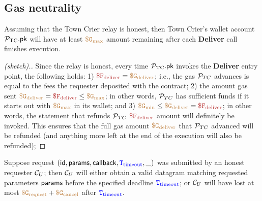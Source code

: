 \subsection{Gas neutrality}

\begin{theorem}
Assuming that the Town Crier relay is honest, 
then Town Crier's wallet account ${\mathcal{P}}_{\text{TC}}.{\sf pk}$ 
will have at least $\tt {\color{brown} \$ G_{\text{max}} }$
amount remaining after each {\bf Deliver}  
call finishes execution.
\end{theorem}
\begin{proof}[(sketch).]
Since the relay is honest, every time 
${\mathcal{P}}_{\text{TC}}.{\sf pk}$ invokes the {\bf Deliver}
entry point, the following holds:
1) 
$\smaroon{\$ F_{\text{deliver}}}
= \sbrown{\$ G_{\text{deliver}}}$;
i.e., the gas ${\cal P}_{TC}$ advances is equal
to the fees the 
requester deposited with the \tcont contract;
2)
the amount gas sent 
$\sbrown{\$ G_{\text{deliver}}} = 
\smaroon{\$ F_{\text{deliver}}}
\leq 
\sbrown{\$ G_{\text{max}}} 
$;
in other words, 
${\cal P}_{TC}$ has sufficient funds  
if it starts out with $\tt {\color{brown} \$ G_{\text{max}} }$
in its wallet;
and
3) 
$\sbrown{\$ G_{\text{min}}} \leq
\sbrown{\$ G_{\text{deliver}}} = 
\smaroon{\$ F_{\text{deliver}}}
$; in other words, the statement that refunds
${\cal P}_{TC}$ 
$\smaroon{\$ F_{\text{deliver}}}$
amount will definitely be invoked. This 
ensures that the full gas amount 
$\tt {\color{brown} \$ G_{\text{deliver}} }$
that ${\cal P}_{TC}$ advanced will be refunded (and anything more left
at the end of the execution will also be refunded);
\end{proof}





\begin{theorem}
Suppose request $({\sf id}, {\sf params}, {\sf callback}, 
{\color{blue} {{\tt T}}_{\text{timeout}}}, \_)$ was submitted
by an honest requester ${\cal C}_U$;
then 
${\cal C}_U$ will  either obtain 
a valid datagram matching requested parameters
${\sf params}$
before the specified deadline  
${\color{blue} {{\tt T}}_{\text{timeout}}}$;
or 
${\cal C}_U$ will have lost at most 
$\tt {\color{brown} \$ G_{\text{request}} } + \tt {\color{brown} \$ G_{\text{cancel}} }$
after ${\color{blue} {{\tt T}}_{\text{timeout}}}$.

\end{theorem}

